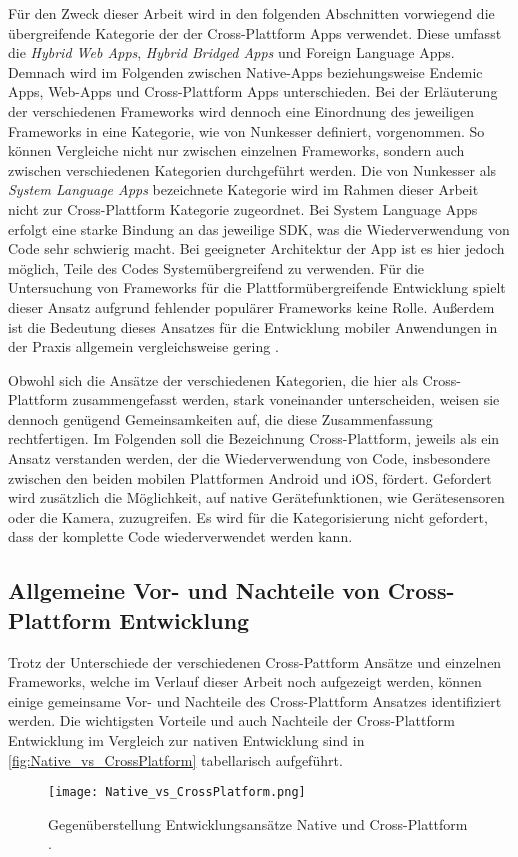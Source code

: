 Für den Zweck dieser Arbeit wird in den folgenden Abschnitten vorwiegend die übergreifende Kategorie der der Cross-Plattform Apps verwendet.
Diese umfasst die \textit{Hybrid Web Apps}, \textit{Hybrid Bridged Apps} und Foreign Language Apps.
Demnach wird im Folgenden zwischen Native-Apps beziehungsweise Endemic Apps, Web-Apps und Cross-Plattform Apps unterschieden.
Bei der Erläuterung der verschiedenen Frameworks wird dennoch eine Einordnung des jeweiligen Frameworks in eine Kategorie, wie von Nunkesser definiert, vorgenommen.
So können Vergleiche nicht nur zwischen einzelnen Frameworks, sondern auch zwischen verschiedenen Kategorien durchgeführt werden.
Die von Nunkesser als \textit{System Language Apps} bezeichnete Kategorie wird im Rahmen dieser Arbeit nicht zur Cross-Plattform Kategorie zugeordnet.
Bei System Language Apps erfolgt eine starke Bindung an das jeweilige \ac{SDK}, was die Wiederverwendung von Code sehr schwierig macht.
Bei geeigneter Architektur der App ist es hier jedoch möglich, Teile des Codes Systemübergreifend zu verwenden.
Für die Untersuchung von Frameworks für die Plattformübergreifende Entwicklung spielt dieser Ansatz aufgrund fehlender populärer Frameworks keine Rolle.
Außerdem ist die Bedeutung dieses Ansatzes für die Entwicklung mobiler Anwendungen in der Praxis allgemein vergleichsweise gering \cite{Nunkesser_Taxonomy_Apps}.

Obwohl sich die Ansätze der verschiedenen Kategorien, die hier als Cross-Plattform zusammengefasst werden, stark voneinander unterscheiden, weisen sie dennoch genügend Gemeinsamkeiten auf, die diese Zusammenfassung rechtfertigen.
Im Folgenden soll die Bezeichnung Cross-Plattform, jeweils als ein Ansatz verstanden werden, der die Wiederverwendung von Code, insbesondere zwischen den beiden mobilen Plattformen Android und iOS, fördert.
Gefordert wird zusätzlich die Möglichkeit, auf native Gerätefunktionen, wie Gerätesensoren oder die Kamera, zuzugreifen.
Es wird für die Kategorisierung nicht gefordert, dass der komplette Code wiederverwendet werden kann.


\subsection{Allgemeine Vor- und Nachteile von Cross-Plattform Entwicklung}
\label{sec:CrossPlattform_Vorteile}

Trotz der Unterschiede der verschiedenen Cross-Pattform Ansätze und einzelnen Frameworks, welche im Verlauf dieser Arbeit noch aufgezeigt werden, können einige gemeinsame Vor- und Nachteile des Cross-Plattform Ansatzes identifiziert werden.
Die wichtigsten Vorteile und auch Nachteile der Cross-Plattform Entwicklung im Vergleich zur nativen Entwicklung sind in \autoref{fig:Native_vs_CrossPlatform} tabellarisch aufgeführt.
\begin{figure}[H]
    \centering
    \texttt{[image: Native\_vs\_CrossPlatform.png]}
    \caption{Gegenüberstellung Entwicklungsansätze Native und Cross-Plattform \cite{Manchanda_CrossPlatformFrameworks}.}
    \label{fig:Native_vs_CrossPlatform}
\end{figure}

